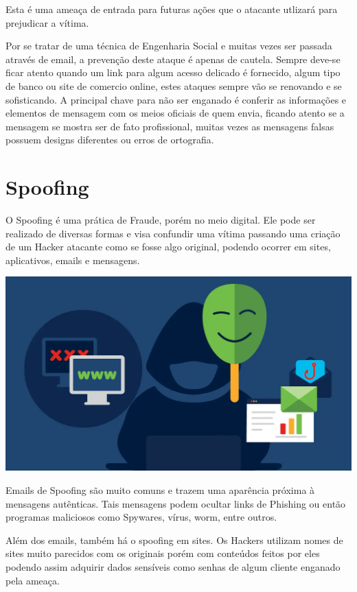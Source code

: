 \begin{ficadica}
Esta é uma ameaça de entrada para futuras ações que o atacante utlizará para prejudicar a vítima.
\end{ficadica}

Por se tratar de uma técnica de Engenharia Social e muitas vezes ser passada através de email, a prevenção deste ataque é apenas de cautela. Sempre deve-se ficar atento quando um link para algum acesso delicado é fornecido, algum tipo de banco ou site de comercio online, estes ataques sempre vão se renovando e se sofisticando. A principal chave para não ser enganado é conferir as informações e elementos de mensagem com os meios oficiais de quem envia, ficando atento se a mensagem se mostra ser de fato profissional, muitas vezes as mensagens falsas possuem designs diferentes ou erros de ortografia.

\section{Spoofing}

O Spoofing é uma prática de Fraude, porém no meio digital. Ele pode ser realizado de diversas formas e visa confundir uma vítima passando uma criação de um Hacker atacante como se fosse algo original, podendo ocorrer em sites, aplicativos, emails e mensagens.

\includegraphics[width=\textwidth]{img/spoofing.png}

Emails de Spoofing são muito comuns e trazem uma aparência próxima à mensagens autênticas. Tais mensagens podem ocultar links de Phishing ou então programas maliciosos como Spywares, vírus, worm, entre outros.

Além dos emails, também há o spoofing em sites. Os Hackers utilizam nomes de sites muito parecidos com os originais porém com conteúdos feitos por eles podendo assim adquirir dados sensíveis como senhas de algum cliente enganado pela ameaça.


